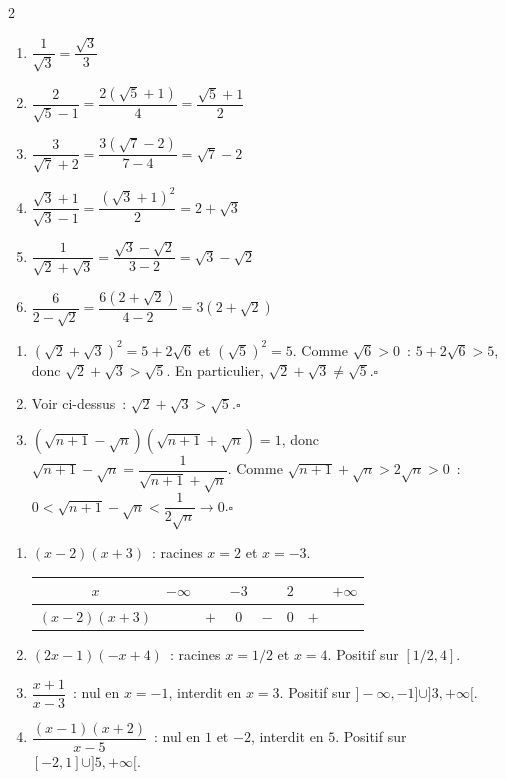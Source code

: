 
\begin{multicols}{2}
\begin{enumerate}
  \item $\dfrac{1}{\sqrt{3}}=\dfrac{\sqrt{3}}{3}$
  \item $\dfrac{2}{\sqrt{5}-1}=\dfrac{2(\sqrt{5}+1)}{4}=\dfrac{\sqrt{5}+1}{2}$
  \item $\dfrac{3}{\sqrt{7}+2}=\dfrac{3(\sqrt{7}-2)}{7-4}=\sqrt{7}-2$
  \item $\dfrac{\sqrt{3}+1}{\sqrt{3}-1}=\dfrac{(\sqrt{3}+1)^2}{2}=2+\sqrt{3}$
  \item $\dfrac{1}{\sqrt{2}+\sqrt{3}}=\dfrac{\sqrt{3}-\sqrt{2}}{3-2}=\sqrt{3}-\sqrt{2}$
  \item $\dfrac{6}{2-\sqrt{2}}=\dfrac{6(2+\sqrt{2})}{4-2}=3(2+\sqrt{2})$
\end{enumerate}
\end{multicols}


\begin{enumerate}
  \item $(\sqrt{2}+\sqrt{3})^2=5+2\sqrt{6}$ et $(\sqrt{5})^2=5$.
        Comme $\sqrt{6}>0$~: $5+2\sqrt{6}>5$, donc $\sqrt{2}+\sqrt{3}>\sqrt{5}$.
        En particulier, $\sqrt{2}+\sqrt{3}\ne\sqrt{5}$.\hfill$\square$
  \item Voir ci-dessus~: $\sqrt{2}+\sqrt{3}>\sqrt{5}$.\hfill$\square$
  \item $(\sqrt{n+1}-\sqrt{n})(\sqrt{n+1}+\sqrt{n})=1$,
        donc $\sqrt{n+1}-\sqrt{n}=\dfrac{1}{\sqrt{n+1}+\sqrt{n}}$.
        Comme $\sqrt{n+1}+\sqrt{n}>2\sqrt{n}>0$~:
        $0<\sqrt{n+1}-\sqrt{n}<\dfrac{1}{2\sqrt{n}}\to0$.\hfill$\square$
\end{enumerate}


\begin{enumerate}
  \item $(x-2)(x+3)$~: racines $x=2$ et $x=-3$.
\begin{center}\renewcommand{\arraystretch}{1.3}
\begin{tabular}{|c|ccccccc|}
\hline $x$ & $-\infty$ & & $-3$ & & $2$ & & $+\infty$ \\\hline
$(x-2)(x+3)$ & & $+$ & $0$ & $-$ & $0$ & $+$ & \\\hline
\end{tabular}
\end{center}
  \item $(2x-1)(-x+4)$~: racines $x=1/2$ et $x=4$.
        Positif sur $[1/2,4]$.
  \item $\dfrac{x+1}{x-3}$~: nul en $x=-1$, interdit en $x=3$.
        Positif sur $]-\infty,-1]\cup]3,+\infty[$.
  \item $\dfrac{(x-1)(x+2)}{x-5}$~: nul en $1$ et $-2$, interdit en $5$.
        Positif sur $[-2,1]\cup]5,+\infty[$.
\end{enumerate}

